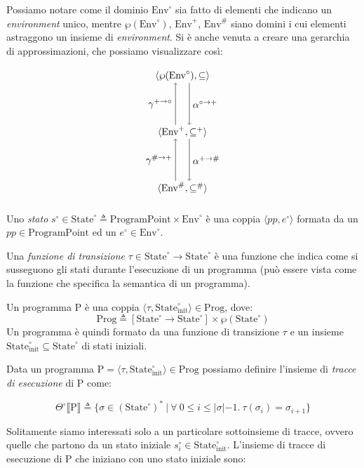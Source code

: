 \documentclass{article}
\newcommand{\envplus}{\textrm{Env}^+}
\newcommand{\envcirc}{\textrm{Env}^{\circ}}
\newcommand{\envsharp}{\textrm{Env}^{\#}}
\newcommand{\statecirc}{\textrm{State}^{\circ}}
\begin{document}
Possiamo notare come il dominio \(\envcirc\) sia fatto di elementi che indicano un \textit{environment} unico, mentre \(\wp(\envcirc)\), \(\envplus\), \(\envsharp\) siano domini i cui elementi astraggono un insieme di \textit{environment}. Si è anche venuta a creare una gerarchia di approssimazioni, che possiamo visualizzare così: 

\[
\begin{tikzpicture}[node distance=2cm]
\node (envcirc) {\(\langle\wp(\envcirc), \subseteq\rangle\)};
\node (envplus) [below of=envcirc] {\(\langle\envplus, \subseteq^{+}\rangle\)};
\node (envsharp) [below of=envplus]{\(\langle\envsharp, \subseteq^{\#}\rangle\)};

\draw [->] (.25,-0.25) -- (.25,-1.75) node[midway, right] {\(\alpha^{\circ\rightarrow +}\)};
\draw [->] (-.25,-1.75) -- (-.25,-0.25) node[midway, left] {\(\gamma^{+ \rightarrow\circ}\)};
\draw [->] (.25,-2.25) -- (.25,-3.75) node[midway, right] {\(\alpha^{+ \rightarrow\#}\)};
\draw [->] (-.25,-3.75) -- (-.25,-2.25) node[midway, left] {\(\gamma^{\# \rightarrow +}\)};
\end{tikzpicture}
\]

Uno \textit{stato} \(s^{\circ}\in\statecirc\triangleq\textrm{ProgramPoint}\times\envcirc\) è una coppia \(\langle pp, e^{\circ}\rangle\) formata da un \(pp\in\textrm{ProgramPoint}\) ed un \(e^{\circ}\in\envcirc\).

Una \textit{funzione di transizione} \(\tau\in\statecirc\rightarrow\statecirc\) è una funzione che indica come si susseguono gli stati durante l'esecuzione di un programma (può essere vista come la funzione che specifica la semantica di un programma). 

Un programma P è una coppia \(\langle\tau, \statecirc_{\textrm{init}}\rangle\in\textrm{Prog}\), dove:
\[\textrm{Prog}\triangleq [\statecirc\rightarrow\statecirc]\times\wp(\statecirc)\] 
Un programma è quindi formato da una funzione di transizione \(\tau\) e un insieme \(\textrm{State}^{\circ}_{\textrm{init}}\subseteq\statecirc\) di stati iniziali. 

Data un programma \(\textrm{P}=\langle\tau, \statecirc_{\textrm{init}}\rangle\in\textrm{Prog}\) possiamo definire l'insieme di \textit{tracce di esecuzione} di P come:

\[\Theta^{\circ}\llbracket\textrm{P}\rrbracket\triangleq\{\sigma\in(\statecirc)^{\ast}\ |\ \forall\ 0\leq i\leq |\sigma|-1.\ \tau(\sigma_i)=\sigma_{i+1}\}\]

Solitamente siamo interessati solo a un particolare sottoinsieme di tracce, ovvero quelle che partono da un stato iniziale \(s^{\circ}_{i}\in\textrm{State}^{\circ}_{\textrm{init}}\). L'insieme di tracce di esecuzione di P che iniziano con uno stato iniziale sono:
\end{document}
